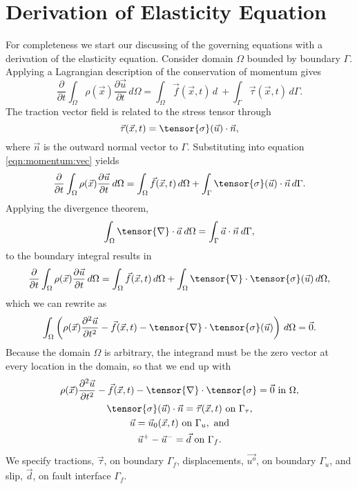 \section{Derivation of Elasticity Equation}

For completeness we start our discussing of the governing equations
with a derivation of the elasticity equation. Consider domain $\Omega$
bounded by boundary $\Gamma$. Applying a Lagrangian description of the
conservation of momentum gives
\begin{equation}
\label{eqn:momentum:vec}
\frac{\partial}{\partial t}\int_{\Omega}\rho(\vec{x})\frac{\partial\vec{u}}{\partial t}\, d\Omega=\int_{\Omega}\vec{f}(\vec{x},t)\, d\ + \int_{\Gamma}\vec{\tau}(\vec{x},t)\, d\Gamma.
\end{equation}
The traction vector field is related to the stress tensor through
\begin{equation}
\vec{\tau}(\vec{x},t) = \tensor{\sigma}(\vec{u}) \cdot \vec{n},
\end{equation}
where $\vec{n}$ is the outward normal vector to $\Gamma$. Substituting
into equation \vref{eqn:momentum:vec} yields
\begin{equation}
\frac{\partial}{\partial t}\int_{\Omega}\rho(\vec{x})\frac{\partial\vec{u}}{\partial t}\, d\Omega=\int_{\Omega}\vec{f}(\vec{x},t)\, d\Omega+\int_{\Gamma}\tensor{\sigma}(\vec{u})\cdot\vec{n}\, d\Gamma.
\end{equation}
Applying the divergence theorem,
\begin{equation}
\int_{\Omega}\tensor{\nabla}\cdot\vec{a}\: d\Omega=\int_{\Gamma}\vec{a}\cdot\vec{n}\: d\Gamma,
\end{equation}
to the boundary integral results in
\begin{equation}
\frac{\partial}{\partial t}\int_{\Omega}\rho(\vec{x})\frac{\partial\vec{u}}{\partial t}\, d\Omega=\int_{\Omega}\vec{f}(\vec{x},t)\, d\Omega+\int_{\Omega}\tensor{\nabla}\cdot\tensor{\sigma}(\vec{u})\, d\Omega,
\end{equation}
which we can rewrite as
\begin{equation}
\int_{\Omega}\left(\rho(\vec{x})\frac{\partial^{2}\vec{u}}{\partial t^{2}}-\vec{f}(\vec{x},t)-\tensor{\nabla}\cdot\tensor{\sigma}(\vec{u})\right)\, d\Omega=\vec{0}.
\end{equation}
Because the domain $\Omega$ is arbitrary, the integrand must be the zero
vector at every location in the domain, so that we end up with
\begin{gather}
\rho(\vec{x})\frac{\partial^{2}\vec{u}}{\partial t^{2}}-\vec{f}(\vec{x},t)-\tensor{\nabla}\cdot\tensor{\sigma}=\vec{0}\text{ in }\Omega,\\
\tensor{\sigma}(\vec{u})\cdot\vec{n}=\vec{\tau}(\vec{x},t)\text{ on }\Gamma_{\tau}\text{,}\\
\vec{u}=\vec{u}_0(\vec{x},t)\text{ on }\Gamma_{u},\text{ and}\\
\vec{u}^{+}-\vec{u}^{-}=\vec{d}\text{ on }\Gamma_{f}.
\end{gather}
We specify tractions, $\vec{\tau}$, on boundary $\Gamma_{f}$, displacements,
$\vec{u^{o}}$, on boundary $\Gamma_{u}$, and slip, $\vec{d}$,
on fault interface $\Gamma_{f}$.
